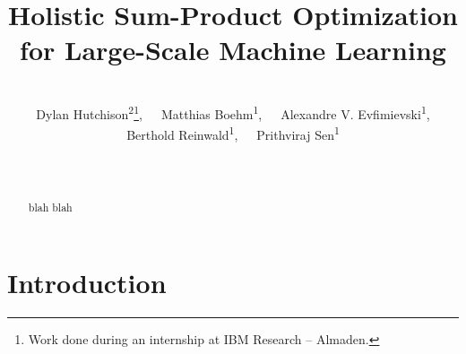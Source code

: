 \documentclass{vldb}
\begin{document}
\title{Holistic Sum-Product Optimization\\for Large-Scale Machine Learning}

\author{
  \alignauthor 
	~\vspace{-0.7cm}\\
	Dylan Hutchison\textsuperscript{2}\thanks{Work done during an internship at IBM Research -- Almaden.},~~~Matthias Boehm\textsuperscript{1},~~~Alexandre V. Evfimievski\textsuperscript{1},\vspace{0.1cm}\\
  Berthold Reinwald\textsuperscript{1},~~~Prithviraj Sen\textsuperscript{1}\\~\\
  \\
}

\maketitle

\begin{abstract}
blah blah
\end{abstract}

\section{Introduction}
\end{document}
